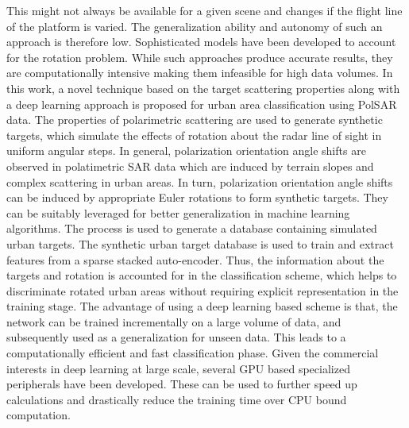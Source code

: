 This might not always be available for a given scene and changes if the flight line of the platform is varied. The generalization ability and autonomy of such an approach is therefore low. 
Sophisticated models have been developed to account for the rotation problem. While such approaches produce accurate results, they are computationally intensive making them infeasible for high data volumes.  
In this work, a novel technique based on the target scattering properties along with a deep learning approach is proposed for urban area classification using PolSAR data. The properties of polarimetric scattering are used to generate synthetic targets, which simulate the effects of rotation about the radar line of sight in uniform angular steps.
In general, polarization orientation angle shifts are observed in polatimetric SAR data which are induced by terrain slopes and complex scattering in urban areas. In turn, polarization orientation angle shifts can be induced by appropriate Euler rotations to form  synthetic targets. They can be suitably leveraged for better generalization in machine learning algorithms. The process is used to generate a database containing simulated urban targets. 
The  synthetic urban target database is  used to train and extract features from a  sparse stacked auto-encoder. Thus, the information about the targets and rotation is accounted for in the classification scheme, which helps to discriminate rotated urban areas without requiring  explicit representation in the training stage. The advantage of using a deep learning based scheme is that, the network can be trained incrementally on a large volume of data, and subsequently used as a generalization for unseen data. This leads to a computationally efficient and fast classification phase. Given the commercial interests in deep learning at large scale, several GPU based specialized peripherals have been developed. These can be used to further speed up calculations and drastically reduce the training time over CPU bound computation. 





